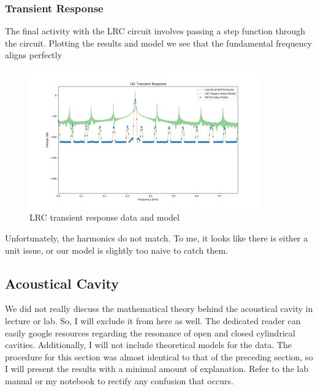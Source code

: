 \documentclass{article}
\begin{document}
\subsubsection{Transient Response}%
\label{ssub:transient_response}

The final activity with the LRC circuit involves passing a step function
through the circuit. Plotting the results and model we see that the fundamental
frequency aligns perfectly

\begin{figure}[H]
    \centering
\begin{minipage}{11cm}
\begin{tcolorbox}
    \centering
        \includegraphics[width=10cm, height=6cm]{figures/figure27.png}
        \caption{LRC transient response data and model}
        \label{fig:fig27}
\end{tcolorbox}
\end{minipage}
\end{figure}

Unfortunately, the harmonics do not match. To me, it looks like there is either
a unit issue, or our model is slightly too naive to catch them.

\subsection{Acoustical Cavity}%
\label{sub:acoustical_cavity}

We did not really discuss the mathematical theory behind the acoustical cavity
in lecture or lab. So, I will exclude it from here as well. The dedicated
reader can easily google resources regarding the resonance of open and closed
cylindrical cavities. Additionally, I will not include theoretical models for
the data. The procedure for this section was almost identical to that of the
preceding section, so I will present the results with a minimal amount of
explanation. Refer to the lab manual or my notebook to rectify any confusion
that occurs.
\end{document}
